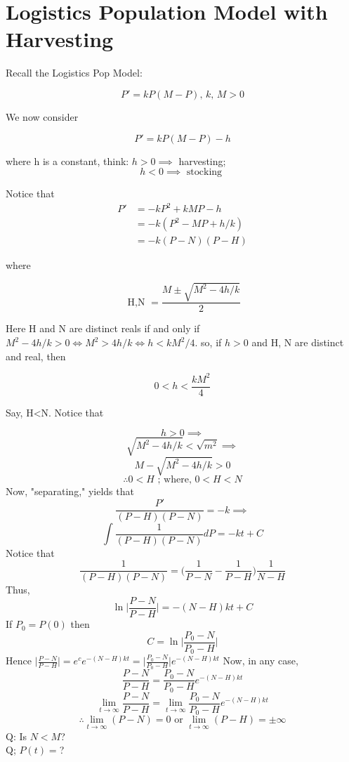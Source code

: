 \documentclass[10pt,a4paper]{article}
\theoremstyle{definition}
\begin{document}

  \newpage 
\section{Logistics Population Model with  Harvesting}

  Recall the Logistics Pop Model: 

  \[ P' = kP(M-P) \text{, }k \text{, } M>0  \]

  We now consider

  \[ P' = kP(M-P)-h \]

  where h is a constant, think: \( h>0 \implies \) harvesting; \\

  \[ h<0 \implies \text{ stocking } \]

  Notice that 
  \begin{align*}
  P' &= -kP^2 + kMP -h \\
   &= -k(P^2 -MP + h/k) \\
   &= -k(P-N)(P-H) 
  \end{align*}

  where

  \[ \text{ H,N  } = \frac{M \pm \sqrt{M^2 -4h/k}}{2} \]

  Here H and N are distinct reals if and only if \( M^2 -4h/k > 0 \iff
   M^2 >4h/k \iff h<kM^2/4 \). so, if \( h>0 \) and H, N are distinct
   and real, then 

  \[ 0 < h< \frac{kM^2}{4} \]

  Say, H<N. Notice that 

  \[ h>0 \implies \]
  \[ \sqrt{M^2 -4h/k} <  \sqrt{m^2} \implies  \]
  \[ M- \sqrt{M^2 - 4h/k} > 0 \]
  \[ \therefore 0<H \text{ ; where,  } 0< H < N  \]
  Now, "separating,"  yields that 
  \[ \frac{P'}{(P-H)(P-N)} = -k \implies \]
  \[ \int \frac{1}{(P-H)(P-N)}dP = -kt + C  \]
  Notice that 
  \[ \frac{1}{(P-H)(P-N)}= \bigg(\frac{1}{P-N} - \frac{1}{P-H}\bigg) \frac{1}{N-H} \]
  Thus, 
  \[ \ln \bigg| \frac{P-N}{P-H}\bigg| = -(N-H)kt + C \]
  If \( P_0 = P(0)  \) then
  \[  C = \ln \bigg| \frac{P_0-N}{P_0-H}\bigg| \]
  Hence \(  \big| \frac{P-N}{P-H}\big| = e^c e^{-(N-H)kt} = \big| \frac{P_0-N}{P_0-H}\big| e^{-(N-H)kt}\)
  Now, in any case, 
  \[ \frac{P-N}{P-H} =  \frac{P_0-N}{P_0-H} e^{-(N-H)kt}\]
  \[ \lim_{t \to \infty} \frac{P-N}{P-H} = \lim_{t \to \infty} \frac{P_0-N}{P_0-H} e^{-(N-H)kt}	 \]
  \[ \therefore \lim_{t \to \infty}(P-N) =0 \text{ or } \lim_{t \to
  \infty} (P-H) = \pm  \infty  \]
  Q: Is \( N<M \)? \\
  Q; \( P(t) =  \)?
\end{document}
